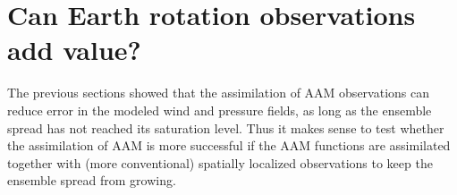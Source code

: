 
\section{Can Earth rotation observations add value?}

The previous sections showed that the assimilation of AAM observations can reduce error in the modeled wind and pressure fields, as long as the ensemble spread has not reached its saturation level. 
Thus it makes sense to test whether the assimilation of AAM is more successful if the AAM functions are assimilated together with (more conventional) spatially localized observations to keep the ensemble spread from growing.


